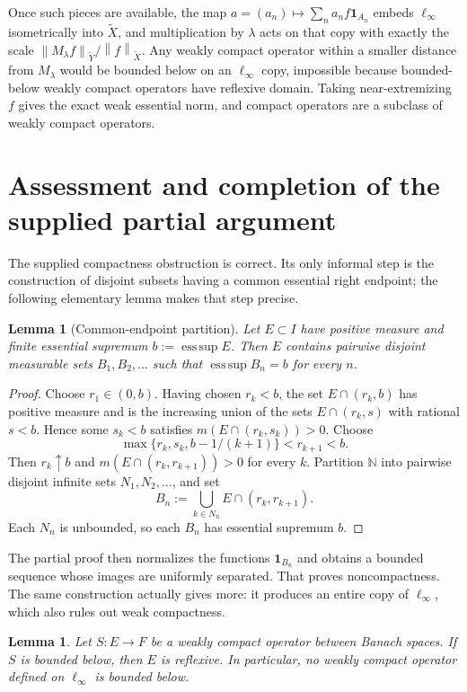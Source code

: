 \documentclass[11pt]{article}
\newtheorem{lemma}[theorem]{Lemma}
\theoremstyle{remark}
\newcommand{\esssup}{\operatorname*{ess\,sup}}
\newcommand{\tX}{\widetilde X}
\newcommand{\tY}{\widetilde Y}
\newcommand{\norm}[1]{\left\lVert #1\right\rVert}
\newcommand{\one}{\mathbf 1}
\begin{document}
Once such pieces are available, the map
$a=(a_n)\mapsto \sum_n a_n f\one_{A_n}$ embeds $\ell_\infty$ isometrically
into $\tX$, and multiplication by $\lambda$ acts on that copy with exactly
the scale $\norm{M_\lambda f}_{\tY}/\norm{f}_{\tX}$.  Any weakly compact
operator within a smaller distance from $M_\lambda$ would be bounded below
on an $\ell_\infty$ copy, impossible because bounded-below weakly compact
operators have reflexive domain.  Taking near-extremizing $f$ gives the
exact weak essential norm, and compact operators are a subclass of weakly
compact operators.

\section{Assessment and completion of the supplied partial argument}

The supplied compactness obstruction is correct.  Its only informal step is
the construction of disjoint subsets having a common essential right
endpoint; the following elementary lemma makes that step precise.

\begin{lemma}[Common-endpoint partition]\label{lem:endpoint}
Let $E\subset I$ have positive measure and finite essential supremum
$b:=\esssup E$.  Then $E$ contains pairwise disjoint measurable sets
$B_1,B_2,\ldots$ such that $\esssup B_n=b$ for every $n$.
\end{lemma}

\begin{proof}
Choose $r_1\in(0,b)$.  Having chosen $r_k<b$, the set
$E\cap(r_k,b)$ has positive measure and is the increasing union of the sets
$E\cap(r_k,s)$ with rational $s<b$.  Hence some $s_k<b$ satisfies
$m(E\cap(r_k,s_k))>0$.  Choose
\[
 \max\{r_k,s_k,b-1/(k+1)\}<r_{k+1}<b.
\]
Then $r_k\uparrow b$ and
$m(E\cap(r_k,r_{k+1}))>0$ for every $k$.  Partition
$\mathbb N$ into pairwise disjoint infinite sets $N_1,N_2,\ldots$, and set
\[
 B_n:=\bigcup_{k\in N_n} E\cap(r_k,r_{k+1}).
\]
Each $N_n$ is unbounded, so each $B_n$ has essential supremum $b$.
\end{proof}

The partial proof then normalizes the functions $\one_{B_n}$ and obtains a
bounded sequence whose images are uniformly separated.  That proves
noncompactness.  The same construction actually gives more: it produces an
entire copy of $\ell_\infty$, which also rules out weak compactness.

\begin{lemma}\label{lem:weak-below}
Let $S:E\to F$ be a weakly compact operator between Banach spaces.  If $S$ is
bounded below, then $E$ is reflexive.  In particular, no weakly compact
operator defined on $\ell_\infty$ is bounded below.
\end{lemma}
\end{document}
